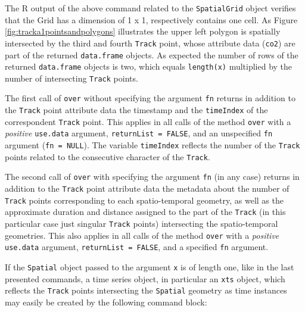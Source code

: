 \documentclass[12pt, oneside, a4paper]{scrbook}
\let\code=\texttt
\begin{document}
The R output of the above command related to the \code{SpatialGrid} object verifies that the Grid has a dimension of 1 x 1, respectively contains one cell.
As Figure \ref{fig:tracka1pointsandpolygons} illustrates the upper left polygon is spatially intersected by the third and fourth \code{Track} point, whose attribute data (\code{co2}) are part of the returned \code{data.frame} objects.
As expected the number of rows of the returned \code{data.frame} objects is two, which equals \code{length(x)} multiplied by the number of intersecting \code{Track} points.
\par\medskip
The first call of \code{over} without specifying the argument \code{fn} returns in addition to the \code{Track} point attribute data the timestamp and the \code{timeIndex} of the correspondent \code{Track} point. 
This applies in all calls of the method \code{over} with a \textit{positive} \code{use.data} argument, \code{returnList = FALSE}, and an unspecified \code{fn} argument (\code{fn = NULL}). 
The variable \code{timeIndex} reflects the number of the \code{Track} points related to the consecutive character of the \code{Track}.
\par\medskip
The second call of \code{over} with specifying the argument \code{fn} (in any case) returns in addition to the \code{Track} point attribute data the metadata about the number of \code{Track} points corresponding to each spatio-temporal geometry, as well as the approximate duration and distance assigned to the part of the \code{Track} (in this particular case just singular \code{Track} points) intersecting the spatio-temporal geometries.
This also applies in all calls of the method \code{over} with a \textit{positive} \code{use.data} argument, \code{returnList = FALSE}, and a specified \code{fn} argument. 
\par\medskip
If the \code{Spatial} object passed to the argument \code{x} is of length one, like in the last presented commands, a time series object, in particular an \code{xts} object, which reflects the \code{Track} points intersecting the \code{Spatial} geometry as time instances may easily be created by the following command block:
\end{document}
